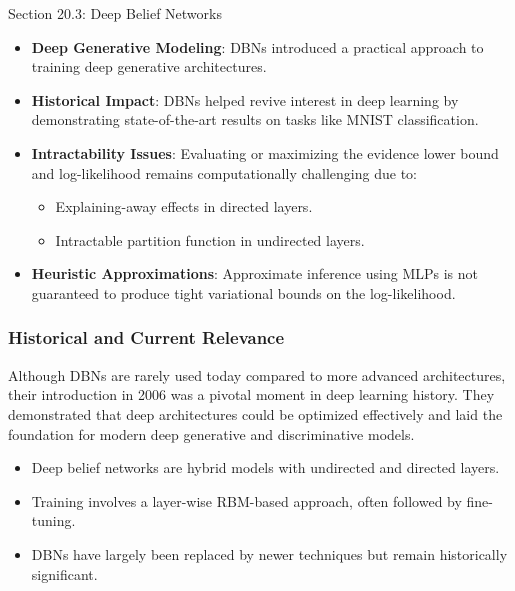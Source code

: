 \begin{notes}{Section 20.3: Deep Belief Networks}
    \begin{highlight}
        \begin{itemize}
            \item \textbf{Deep Generative Modeling}: DBNs introduced a practical approach to training deep generative architectures.
            \item \textbf{Historical Impact}: DBNs helped revive interest in deep learning by demonstrating state-of-the-art results on tasks like MNIST classification.
            \item \textbf{Intractability Issues}: Evaluating or maximizing the evidence lower bound and log-likelihood remains computationally challenging due to:
                \begin{itemize}
                    \item Explaining-away effects in directed layers.
                    \item Intractable partition function in undirected layers.
                \end{itemize}
            \item \textbf{Heuristic Approximations}: Approximate inference using MLPs is not guaranteed to produce tight variational bounds on the log-likelihood.
        \end{itemize}
    \end{highlight}
    
    \subsubsection*{Historical and Current Relevance}
    
    Although DBNs are rarely used today compared to more advanced architectures, their introduction in 2006 was a pivotal moment in deep learning history. They demonstrated that deep architectures could be optimized effectively and laid the foundation for modern deep generative and discriminative models.
    
    \begin{highlight}
        \begin{itemize}
            \item Deep belief networks are hybrid models with undirected and directed layers.
            \item Training involves a layer-wise RBM-based approach, often followed by fine-tuning.
            \item DBNs have largely been replaced by newer techniques but remain historically significant.
        \end{itemize}
    \end{highlight}
\end{notes}

